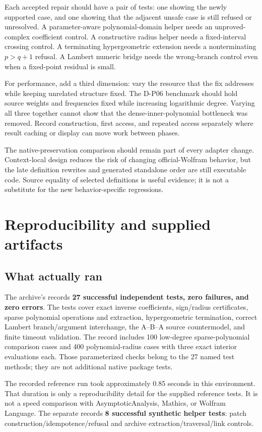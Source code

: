 \documentclass[11pt,a4paper]{article}
\theoremstyle{remark}
\begin{document}
Each accepted repair should have a pair of tests: one showing the newly supported case, and one showing that the adjacent unsafe case is still refused or unresolved. A parameter-aware polynomial-domain helper needs an unproved-complex coefficient control. A constructive radius helper needs a fixed-interval crossing control. A terminating hypergeometric extension needs a nonterminating $p>q+1$ refusal. A Lambert numeric bridge needs the wrong-branch control even when a fixed-point residual is small.

For performance, add a third dimension: vary the resource that the fix addresses while keeping unrelated structure fixed. The D-P06 benchmark should hold source weights and frequencies fixed while increasing logarithmic degree. Varying all three together cannot show that the dense-inner-polynomial bottleneck was removed. Record construction, first access, and repeated access separately where result caching or display can move work between phases.

The native-preservation comparison should remain part of every adapter change. Context-local design reduces the risk of changing official-Wolfram behavior, but the late definition rewrites and generated standalone order are still executable code. Source equality of selected definitions is useful evidence; it is not a substitute for the new behavior-specific regressions.

\section{Reproducibility and supplied artifacts}\label{sec:repro}
\subsection{What actually ran}

The archive's  records \textbf{27 successful independent tests, zero failures, and zero errors}. The tests cover exact inverse coefficients, sign/radius certificates, sparse polynomial operations and extraction, hypergeometric termination, correct Lambert branch/argument interchange, the A--B--A source countermodel, and finite timeout validation. The record includes 100 low-degree sparse-polynomial comparison cases and 400 polynomial-radius cases with three exact interior evaluations each. Those parameterized checks belong to the 27 named test methods; they are not additional native package tests.

The recorded reference run took approximately 0.85 seconds in this environment. That duration is only a reproducibility detail for the supplied reference tests. It is not a speed comparison with AsymptoticAnalysis, Mathics, or Wolfram Language. The separate  records \textbf{8 successful synthetic helper tests}: patch construction/idempotence/refusal and archive extraction/traversal/link controls.
\end{document}
